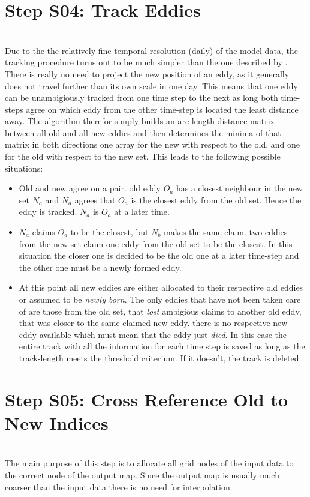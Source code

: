 \section{Step S04: Track Eddies}
\\
Due to the the relatively fine temporal resolution (daily) of the model data,
the tracking procedure turns out to be much simpler than the one described by
\cite{Chelton2007}. There is really no need to project the new position of an
eddy, as it generally does not travel further than its own scale in one day.
This means that one eddy can be unambigiously tracked from one time step to the
next as long both time-steps agree on which eddy from the other
time-step is located the least distance away.
The algorithm therefor simply builds an arc-length-distance matrix
between all old and all new eddies and then determines the minima of that
matrix in both directions \ie one array for the new with respect to the old,
and one for the old with respect to the new set. This leads to the following
possible situations:
\begin{itemize}
	\item 
	Old and new agree on a pair. \Ie old eddy $O_a$ has a closest neighbour in
the new set $N_a$ and $N_a$ agrees that $O_a$ is the closest eddy from the old
set. Hence the eddy is tracked.  $N_a$ is $O_a$ at a later time.
\item
$N_a$ claims $O_a$ to be the closest, but $N_b$ makes the same claim. \Ie two
eddies from the new set claim one eddy from the old set to be the closest. 
In this situation the closer one is decided to be the old one at a later
time-step and the other one must be a newly formed eddy.
\item 
At this point all new eddies are either allocated to their respective old
eddies or assumed to be \textit{newly born}. The only eddies that have not been
taken care of are those from the old set, that \textit{lost} ambigious claims to
another old eddy, that was closer to the same claimed new eddy. \Ie there is no
respective new eddy available which must mean that the eddy just \textit{died}.
In this case the entire track with all the information for each time step is
saved as long as the track-length meets the threshold criterium. If it doesn't,
the track is deleted. 
\end{itemize}

\section{Step S05: Cross Reference Old to New Indices}
\\
The main purpose of this step is to allocate all grid nodes of the input data
to the correct node of the output map. Since the output map is usually much
coarser than the input data there is no need for interpolation.  

